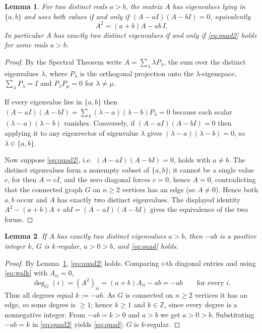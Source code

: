 \documentclass{amsart}
\newtheorem{lemma}{Lemma}
\theoremstyle{definition}
\begin{document}
\begin{lemma}\label{lem:quad}
For two distinct reals $a>b$, the matrix $A$ has eigenvalues lying in
$\{a,b\}$ and uses both values if and only if $(A-aI)(A-bI)=0$, equivalently
\begin{equation}\label{eq:quad2}
A^2=(a+b)A-ab\,I .
\end{equation}
In particular $A$ has exactly two distinct eigenvalues if and only if
\eqref{eq:quad2} holds for some reals $a>b$.
\end{lemma}

\begin{proof}
By the Spectral Theorem write $A=\sum_{\lambda}\lambda P_\lambda$, the sum over
the distinct eigenvalues $\lambda$, where $P_\lambda$ is the orthogonal
projection onto the $\lambda$-eigenspace, $\sum_\lambda P_\lambda=I$ and
$P_\lambda P_\mu=0$ for $\lambda\ne\mu$.

If every eigenvalue lies in $\{a,b\}$ then
$(A-aI)(A-bI)=\sum_\lambda(\lambda-a)(\lambda-b)P_\lambda=0$ because each scalar
$(\lambda-a)(\lambda-b)$ vanishes. Conversely, if $(A-aI)(A-bI)=0$ then
applying it to any eigenvector of eigenvalue $\lambda$ gives
$(\lambda-a)(\lambda-b)=0$, so $\lambda\in\{a,b\}$.

Now suppose \eqref{eq:quad2}, i.e.\ $(A-aI)(A-bI)=0$, holds with $a\ne b$. The
distinct eigenvalues form a nonempty subset of $\{a,b\}$; it cannot be a single
value $c$, for then $A=cI$, and the zero diagonal forces $c=0$, hence $A=0$,
contradicting that the connected graph $G$ on $n\ge2$ vertices has an edge
(so $A\ne0$). Hence both $a,b$ occur and $A$ has exactly two distinct
eigenvalues. The displayed identity
$A^2-(a+b)A+abI=(A-aI)(A-bI)$ gives the equivalence of the two forms.
\end{proof}

\begin{lemma}\label{lem:regular}
If $A$ has exactly two distinct eigenvalues $a>b$, then $-ab$ is a positive
integer $k$, $G$ is $k$-regular, $a>0>b$, and \eqref{eq:quad} holds.
\end{lemma}

\begin{proof}
By Lemma~\ref{lem:quad}, \eqref{eq:quad2} holds. Comparing $i$-th diagonal
entries and using \eqref{eq:walk} with $A_{ii}=0$,
\[
\deg_G(i)=(A^2)_{ii}=(a+b)A_{ii}-ab=-ab\qquad\text{for every }i .
\]
Thus all degrees equal $k:=-ab$. As $G$ is connected on $n\ge2$ vertices it has
an edge, so some degree is $\ge1$; hence $k\ge1$ and $k\in\mathbb Z$, since
every degree is a nonnegative integer. From $-ab=k>0$ and $a>b$ we get
$a>0>b$. Substituting $-ab=k$ in \eqref{eq:quad2} yields \eqref{eq:quad}; $G$
is $k$-regular.
\end{proof}
\end{document}
